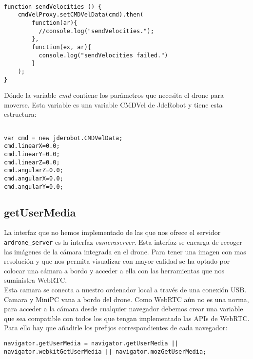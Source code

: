 \begin{lstlisting}[caption=Función manejadora de las órdenes.]

function sendVelocities () {
    cmdVelProxy.setCMDVelData(cmd).then(
        function(ar){
          //console.log("sendVelocities.");
        },
        function(ex, ar){
          console.log("sendVelocities failed.")
        }
    );
}

\end{lstlisting}

Dónde la variable \emph{cmd} contiene los parámetros que necesita el drone para moverse. Esta variable es una variable CMDVel de JdeRobot y tiene esta estructura:\\

\begin{lstlisting}[caption=Variable CMD]

var cmd = new jderobot.CMDVelData; 
cmd.linearX=0.0;
cmd.linearY=0.0;
cmd.linearZ=0.0;
cmd.angularZ=0.0;
cmd.angularX=0.0;
cmd.angularY=0.0;

\end{lstlisting}




\subsection{getUserMedia}

La interfaz que no hemos implementado de las que nos ofrece el servidor \texttt{ardrone\_server} es la interfaz \emph{cameraserver}. Esta interfaz se encarga de recoger las imágenes de la cámara integrada en el drone. Para tener una imagen con mas resolución y que nos permita visualizar con mayor calidad se ha optado por colocar una cámara a bordo y acceder a ella con las herramientas que nos suministra WebRTC.\\

Esta camara se conecta a nuestro ordenador local a través de una conexión USB. Camara y MiniPC vana a bordo del drone. Como WebRTC aún no es una norma, para acceder a la cámara desde cualquier navegador debemos crear una variable que sea compatible con todos los que tengan implementado las APIs de WebRTC. Para ello hay que añadirle los prefijos correspondientes de cada navegador:\\


\begin{lstlisting}[caption=Variable de getUserMedia.]
navigator.getUserMedia = navigator.getUserMedia || navigator.webkitGetUserMedia || navigator.mozGetUserMedia;
\end{lstlisting}


